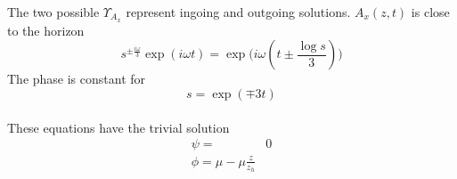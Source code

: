 \documentclass[12pt]{report}
\renewcommand{\i}{\ensuremath{i}}
\newcommand{\At}{\ensuremath{{\phi}}}
\begin{document}
The two possible $\Upsilon_{A_x}$ represent ingoing and outgoing solutions. $A_x(z,t)$ is close to the horizon
\begin{equation}
 s^{\pm\frac{\i\omega}{3}}\exp(\i\omega t)=\exp\big(\i\omega(t\pm\frac{\log s}{3})\big)
\end{equation}
The phase is constant for
\begin{equation}
 s=\exp(\mp3t)
\end{equation}
\\These equations have the trivial solution
\begin{equation}
 \begin{split}
  \psi=&0\\
  \At=\mu-\mu\frac{z}{z_h}\label{trivial}
 \end{split}
\end{equation}
\end{document}
